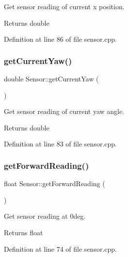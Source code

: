 Get sensor reading of current x position. 

\begin{DoxyReturn}{Returns}
double 
\end{DoxyReturn}


Definition at line 86 of file sensor.\+cpp.

\mbox{\label{class_sensor_a1984ff9826d1c92d7e91add776a4107b}} 
\subsubsection{\texorpdfstring{get\+Current\+Yaw()}{getCurrentYaw()}}
{\footnotesize\ttfamily double Sensor\+::get\+Current\+Yaw (\begin{DoxyParamCaption}{ }\end{DoxyParamCaption})}



Get sensor reading of current yaw angle. 

\begin{DoxyReturn}{Returns}
double 
\end{DoxyReturn}


Definition at line 83 of file sensor.\+cpp.

\mbox{\label{class_sensor_a0cb8d226a7df00fa404c100f959868e6}} 
\subsubsection{\texorpdfstring{get\+Forward\+Reading()}{getForwardReading()}}
{\footnotesize\ttfamily float Sensor\+::get\+Forward\+Reading (\begin{DoxyParamCaption}{ }\end{DoxyParamCaption})}



Get sensor reading at 0deg. 

\begin{DoxyReturn}{Returns}
float 
\end{DoxyReturn}


Definition at line 74 of file sensor.\+cpp.

\mbox{\label{class_sensor_a68826b1eb0dcda3a0508f213a42db25b}} 
